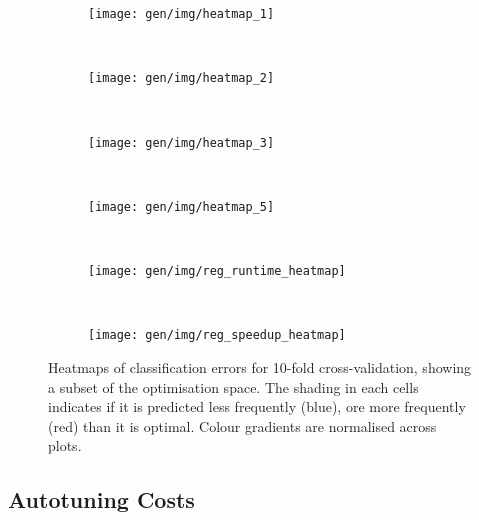 \begin{figure}
\centering
\begin{subfigure}[t]{0.45\textwidth}
\centering
\texttt{[image: gen/img/heatmap\_1]}
\vspace{-1.5em} %
\caption{}
\label{fig:coverage}
\end{subfigure}
~%
\begin{subfigure}[t]{0.45\textwidth}
\centering
\texttt{[image: gen/img/heatmap\_2]}
\vspace{-1.5em} %
\caption{}
\label{fig:coverage}
\end{subfigure}
\\
\begin{subfigure}[t]{0.45\textwidth}
\centering
\texttt{[image: gen/img/heatmap\_3]}
\vspace{-1.5em} %
\caption{}
\label{fig:coverage}
\end{subfigure}
~%
\begin{subfigure}[t]{0.45\textwidth}
\centering
\texttt{[image: gen/img/heatmap\_5]}
\vspace{-1.5em} %
\caption{}
\label{fig:coverage}
\end{subfigure}
\\
\begin{subfigure}[t]{0.45\textwidth}
\centering
\texttt{[image: gen/img/reg\_runtime\_heatmap]}
\vspace{-1.5em} %
\caption{}
\label{fig:coverage}
\end{subfigure}
~%
\begin{subfigure}[t]{0.45\textwidth}
\centering
\texttt{[image: gen/img/reg\_speedup\_heatmap]}
\vspace{-1.5em} %
\caption{}
\label{fig:coverage}
\end{subfigure}
\caption{%
  Heatmaps of classification errors for 10-fold cross-validation,
  showing a subset of the optimisation space. The shading in each
  cells indicates if it is predicted less frequently (blue), ore more
  frequently (red) than it is optimal. Colour gradients are normalised
  across plots.%
}
\label{fig:class-hmaps}
\end{figure}


\subsection{Autotuning Costs}\label{subsec:autotune-costs}

